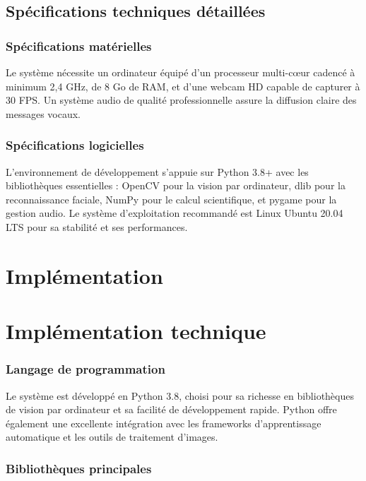 \documentclass[12pt,a4paper]{article}
\begin{document}
\subsection{Spécifications techniques détaillées}

\subsubsection{Spécifications matérielles}

Le système nécessite un ordinateur équipé d'un processeur multi-cœur cadencé à minimum 2,4 GHz, de 8 Go de RAM, et d'une webcam HD capable de capturer à 30 FPS. Un système audio de qualité professionnelle assure la diffusion claire des messages vocaux.

\subsubsection{Spécifications logicielles}

L'environnement de développement s'appuie sur Python 3.8+ avec les bibliothèques essentielles : OpenCV pour la vision par ordinateur, dlib pour la reconnaissance faciale, NumPy pour le calcul scientifique, et pygame pour la gestion audio. Le système d'exploitation recommandé est Linux Ubuntu 20.04 LTS pour sa stabilité et ses performances.

\newpage

\section{Implémentation}

\section{Implémentation technique}

\subsubsection{Langage de programmation}

Le système est développé en Python 3.8, choisi pour sa richesse en bibliothèques de vision par ordinateur et sa facilité de développement rapide. Python offre également une excellente intégration avec les frameworks d'apprentissage automatique et les outils de traitement d'images.

\subsubsection{Bibliothèques principales}
\end{document}
